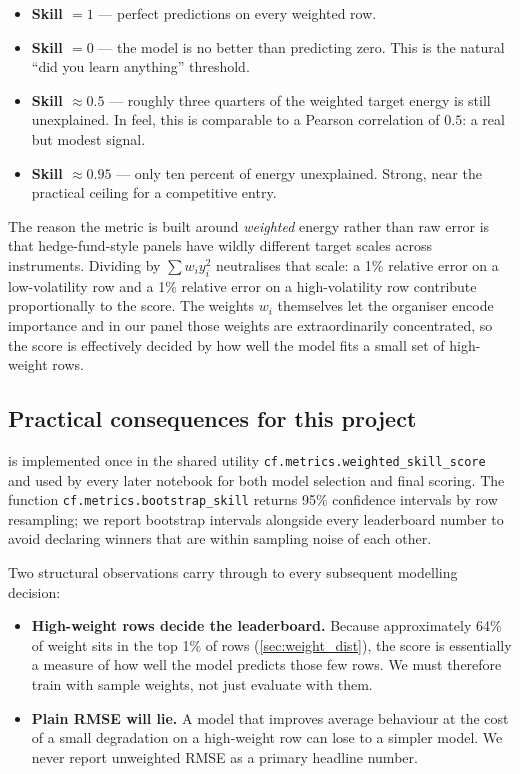 \begin{itemize}
  \item \textbf{Skill $= 1$} --- perfect predictions on every weighted row.
  \item \textbf{Skill $= 0$} --- the model is no better than predicting zero. This is the natural ``did you learn anything'' threshold.
  \item \textbf{Skill $\approx 0.5$} --- roughly three quarters of the weighted target energy is still unexplained. In feel, this is comparable to a Pearson correlation of $0.5$: a real but modest signal.
  \item \textbf{Skill $\approx 0.95$} --- only ten percent of energy unexplained. Strong, near the practical ceiling for a competitive entry.
\end{itemize}

The reason the metric is built around \emph{weighted} energy rather than raw error is that hedge-fund-style panels have wildly different target scales across instruments. Dividing by $\sum w_i y_i^2$ neutralises that scale: a 1\% relative error on a low-volatility row and a 1\% relative error on a high-volatility row contribute proportionally to the score. The weights $w_i$ themselves let the organiser encode importance and in our panel those weights are extraordinarily concentrated, so the score is effectively decided by how well the model fits a small set of high-weight rows.

\subsection{Practical consequences for this project}

 is implemented once in the shared utility \texttt{cf.metrics.weighted\_skill\_score} and used by every later notebook for both model selection and final scoring. The function \texttt{cf.metrics.bootstrap\_skill} returns 95\% confidence intervals by row resampling; we report bootstrap intervals alongside every leaderboard number to avoid declaring winners that are within sampling noise of each other.

Two structural observations carry through to every subsequent modelling decision:

\begin{itemize}
  \item \textbf{High-weight rows decide the leaderboard.} Because approximately 64\% of weight sits in the top 1\% of rows (\cref{sec:weight_dist}), the score is essentially a measure of how well the model predicts those few rows. We must therefore train with sample weights, not just evaluate with them.
  \item \textbf{Plain RMSE will lie.} A model that improves average behaviour at the cost of a small degradation on a high-weight row can lose to a simpler model. We never report unweighted RMSE as a primary headline number.
\end{itemize}
